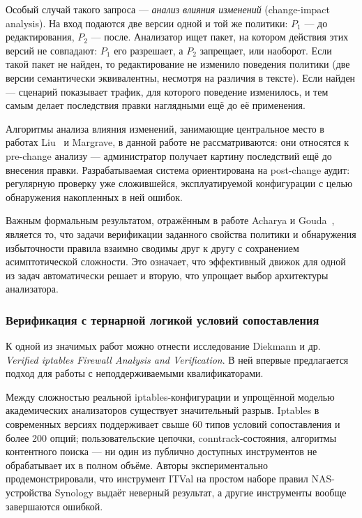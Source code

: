 Особый случай такого запроса --- \emph{анализ влияния изменений} (change-impact analysis). На вход подаются две версии одной и той же политики: $P_1$ --- до редактирования, $P_2$ --- после. Анализатор ищет пакет, на котором действия этих версий не совпадают: $P_1$ его разрешает, а $P_2$ запрещает, или наоборот. Если такой пакет не найден, то редактирование не изменило поведения политики (две версии семантически эквивалентны, несмотря на различия в тексте). Если найден --- сценарий показывает трафик, для которого поведение изменилось, и тем самым делает последствия правки наглядными ещё до её применения.

Алгоритмы анализа влияния изменений, занимающие центральное место в работах Liu~\cite{liu2008firewall} и Margrave, в данной работе не рассматриваются: они относятся к pre-change анализу --- администратор получает картину последствий ещё до внесения правки. Разрабатываемая система ориентирована на post-change аудит: регулярную проверку уже сложившейся, эксплуатируемой конфигурации с целью обнаружения накопленных в ней ошибок.

Важным формальным результатом, отражённым в работе Acharya и Gouda~\cite{acharya2011firewall}, является то, что задачи верификации заданного свойства политики и обнаружения избыточности правила взаимно сводимы друг к другу с сохранением асимптотической сложности. Это означает, что эффективный движок для одной из задач автоматически решает и вторую, что упрощает выбор архитектуры анализатора.

\subsubsection{Верификация с тернарной логикой условий сопоставления}
\label{sec:Section2:verified}

К одной из значимых работ можно отнести исследование Diekmann и др.~\cite{diekmann2018verified} \emph{Verified iptables Firewall Analysis and Verification}. В ней впервые предлагается подход для работы с неподдерживаемыми квалификаторами.

Между сложностью реальной iptables-конфигурации и упрощённой моделью академических анализаторов существует значительный разрыв. Iptables в современных версиях поддерживает свыше 60 типов условий сопоставления и более 200 опций; пользовательские цепочки, conntrack-состояния, алгоритмы контентного поиска --- ни один из публично доступных инструментов не обрабатывает их в полном объёме. Авторы экспериментально продемонстрировали, что инструмент ITVal на простом наборе правил NAS-устройства Synology выдаёт неверный результат, а другие инструменты вообще завершаются ошибкой.

